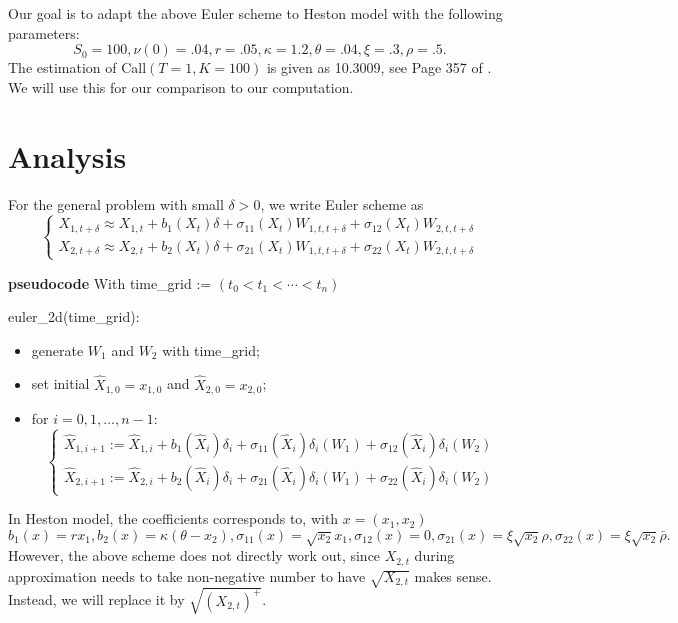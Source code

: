 \documentclass{article}
\begin{document}
Our goal is to adapt the above Euler scheme to Heston model with the following parameters:
$$ S_{0} = 100, \nu(0) = .04, r = .05, \kappa = 1.2, 
\theta = .04, \xi = .3, \rho = .5.$$
The estimation of Call$(T =1, K = 100)$ is given as 10.3009, see Page 357 of \cite{Gla04}. We will use this for our comparison to our computation.



\section{Analysis}

For the general problem with small $\delta>0$, we write Euler scheme as
$$
\left\{
\begin{array}
 {ll}
 X_{1, t+\delta} \approx X_{1, t} + b_{1}(X_{t}) \delta + \sigma_{11} (X_{t}) W_{1, t, t+\delta} + \sigma_{12}(X_{t}) W_{2, t, t+\delta} \\
 X_{2, t+\delta} \approx X_{2, t} + b_{2}(X_{t}) \delta + \sigma_{21} (X_{t}) W_{1, t, t+\delta} + \sigma_{22}(X_{t}) W_{2, t, t+\delta} 
\end{array}
\right.
$$

{\bf pseudocode} 
With time\_grid := $(t_{0}< t_{1}<\cdots <t_{n})$

euler\_2d(time\_grid):
\begin{itemize}
 \item generate $W_{1}$ and $W_{2}$ with time\_grid;
 \item set initial $\hat X_{1,0} = x_{1,0}$ and $\hat X_{2,0} = x_{2,0}$;
 \item for $i = 0, 1, \ldots, n-1$: \\
 $$
\left\{
\begin{array}
 {ll}
 \hat X_{1, i+1} := 
 \hat X_{1, i} + b_{1}(\hat X_{i}) \delta_{i} + 
 \sigma_{11} (\hat X_{i}) \delta_{i} (W_{1}) + 
 \sigma_{12}(\hat X_{i}) \delta_{i} (W_{2}) \\
  \hat X_{2, i+1} := 
 \hat X_{2, i} + b_{2}(\hat X_{i}) \delta_{i} + 
 \sigma_{21} (\hat X_{i}) \delta_{i} (W_{1}) + 
 \sigma_{22}(\hat X_{i}) \delta_{i} (W_{2}) 
\end{array}
\right.
$$
\end{itemize}




In Heston model, the coefficients corresponds to, with $x = (x_{1}, x_{2})$
$$b_{1}(x) = r x_{1}, b_{2}(x) = \kappa (\theta - x_{2}), 
\sigma_{11} (x)  = \sqrt{x_{2}} x_{1}, \sigma_{12}(x) = 0,
\sigma_{21}(x) = \xi \sqrt{x_{2}} \rho, \sigma_{22}(x) = \xi \sqrt{x_{2}} \bar \rho
.$$
However, the above scheme does not directly work out, since $X_{2, t}$ during approximation needs to take non-negative number to have $\sqrt{X_{2,t}}$ makes sense. Instead, we will replace it by $\sqrt{(X_{2,t})^{+}}$. 
\end{document}
